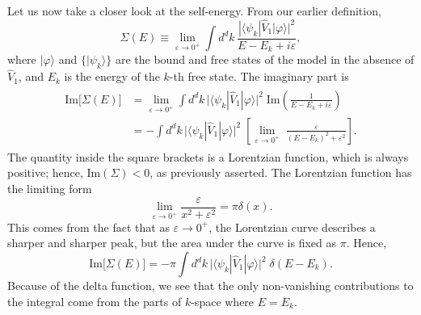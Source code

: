 \documentclass[pra,12pt]{revtex4}
\begin{document}
Let us now take a closer look at the self-energy.  From our earlier
definition,
\begin{equation}
  \Sigma(E) \equiv \lim_{\varepsilon\rightarrow0^+} \int d^dk\, \frac{\displaystyle| \langle\psi_k| \hat{V}_1|\varphi\rangle|^2}{\displaystyle E-E_k+i\varepsilon},
\end{equation}
where $|\varphi\rangle$ and $\{|\psi_k\rangle\}$ are the bound and
free states of the model in the absence of $\hat{V}_1$, and $E_k$ is
the energy of the $k$-th free state.  The imaginary part is
\begin{align}
  \begin{aligned}\mathrm{Im}\big[\Sigma(E)\big] &= \lim_{\varepsilon\rightarrow0^+} \int d^dk\, \Big| \langle\psi_k| \hat{V}_1|\varphi\rangle\Big|^2 \; \mathrm{Im}\left( \frac{1}{\displaystyle E-E_k+i\varepsilon}\right) \\ &= - \int d^dk\, \Big| \langle\psi_k| \hat{V}_1|\varphi\rangle\Big|^2 \; \left[ \lim_{\varepsilon\rightarrow0^+} \; \frac{\varepsilon}{\displaystyle (E-E_k)^2 + \varepsilon^2}\right].\end{aligned}
\end{align}
The quantity inside the square brackets is a Lorentzian function,
which is always positive; hence, $\mathrm{Im}(\Sigma) < 0$, as
previously asserted.  The Lorentzian function has the limiting form
\begin{equation}
  \lim_{\varepsilon\rightarrow 0^+} \frac{\varepsilon}{x^2+\varepsilon^2} = \pi\delta(x).
\end{equation}
This comes from the fact that as $\varepsilon\rightarrow0^+$, the
Lorentzian curve describes a sharper and sharper peak, but the area
under the curve is fixed as $\pi$.  Hence,
\begin{equation}
  \mathrm{Im}\big[\Sigma(E)\big] = - \pi \int d^dk\, \Big| \langle\psi_k| \hat{V}_1|\varphi\rangle\Big|^2 \; \delta(E-E_k).
\end{equation}
Because of the delta function, we see that the only non-vanishing
contributions to the integral come from the parts of $k$-space where
$E = E_k$.
\end{document}
